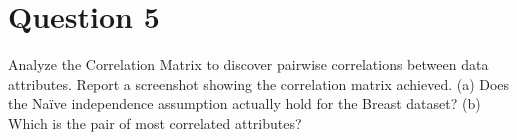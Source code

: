 \section{Question 5}

\begin{question}
    Analyze the Correlation Matrix to discover pairwise correlations between data attributes. Report a
screenshot showing the correlation matrix achieved. (a) Does the Naïve independence assumption
actually hold for the Breast dataset? (b) Which is the pair of most correlated attributes?
\end{question}

\begin{answer}
\end{answer}
